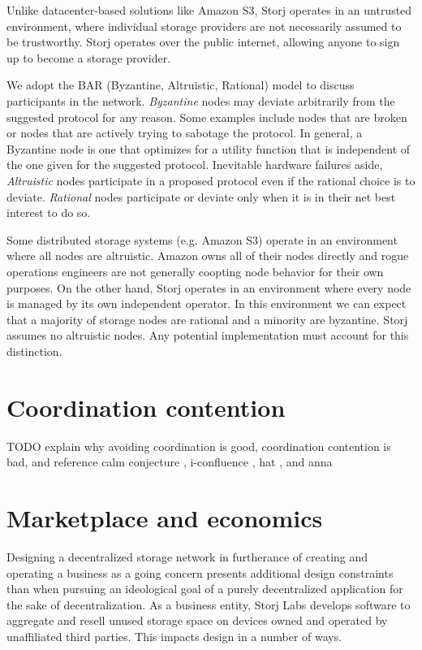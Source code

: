 \documentclass[11pt,fleqn,openany]{book}
\newcommand{\todo}[1]{{\color{red} TODO #1 }}
\begin{document}
Unlike datacenter-based solutions like Amazon S3, Storj operates in an untrusted
environment, where individual storage providers are not necessarily assumed to be
trustworthy. Storj operates over the public internet, allowing anyone to sign
up to become a storage provider.

We adopt the BAR (Byzantine, Altruistic, Rational) model \cite{bar} to discuss
participants in the network.
{\em Byzantine} nodes may deviate arbitrarily from the suggested protocol for
any reason. Some examples include nodes that are broken or nodes that
are actively trying to sabotage the protocol. In general, a Byzantine node is
one that optimizes for a utility function that is independent of the one
given for the suggested protocol.
Inevitable hardware failures aside, {\em Altruistic} nodes
participate in a proposed protocol even if the rational choice is to deviate.
{\em Rational} nodes participate or deviate only when it
is in their net best interest to do so.

Some distributed storage systems (e.g. Amazon S3) operate in an environment
where all nodes are altruistic. Amazon owns all of their nodes directly and
rogue operations engineers are not generally coopting node behavior for their
own purposes.
On the other hand, Storj operates in an environment where every node is
managed by its own independent operator.
In this environment we can expect that a majority
of storage nodes are rational and a minority are byzantine. Storj assumes no
altruistic nodes. Any potential implementation must account for this distinction.

\section{Coordination contention}

\todo{explain why avoiding coordination is good, coordination contention
is bad, and reference calm conjecture
\cite{calm1, calm2}, i-confluence \cite{i-confluence}, hat \cite{hat}, and
anna \cite{anna}}

\section{Marketplace and economics}

Designing a decentralized storage network in furtherance of creating and
operating a business as a going concern presents additional design constraints
than when pursuing an ideological goal of a purely decentralized application
for the sake of decentralization.
As a business entity, Storj Labs develops software to aggregate and resell
unused storage space on devices owned and operated by unaffiliated third
parties. This impacts design in a number of ways.
\end{document}
